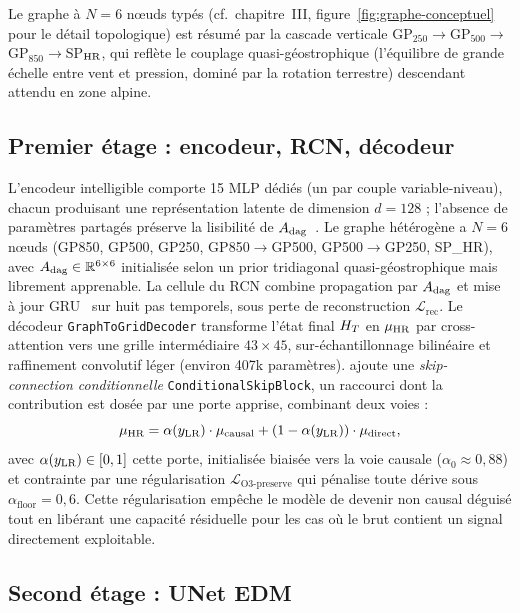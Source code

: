 Le graphe à $N=6$ n\oe uds typés (cf.~chapitre~III, figure~\ref{fig:graphe-conceptuel} pour le détail topologique) est résumé par la cascade verticale GP$_{250}\!\to\!$GP$_{500}\!\to\!$GP$_{850}\!\to\!$SP$_{\text{HR}}$, qui reflète le couplage quasi-géostrophique (l'équilibre de grande échelle entre vent et pression, dominé par la rotation terrestre) descendant attendu en zone alpine.

\subsection{Premier étage : encodeur, RCN, décodeur}
\label{ssec:exp-topo-stage1}

L'encodeur intelligible comporte 15 MLP dédiés (un par couple variable-niveau), chacun produisant une représentation latente de dimension $d = 128$ ; l'absence de paramètres partagés préserve la lisibilité de $A_{\mathrm{dag}}$~\cite{bello_dagma_2022}. Le graphe hétérogène a $N = 6$ nœuds (GP850, GP500, GP250, GP850$\to$GP500, GP500$\to$GP250, SP\_HR), avec $A_{\mathrm{dag}} \in \mathbb{R}^{6 \times 6}$ initialisée selon un prior tridiagonal quasi-géostrophique mais librement apprenable. La cellule du RCN combine propagation par $A_{\mathrm{dag}}$ et mise à jour GRU~\cite{cho_gru_2014} sur huit pas temporels, sous perte de reconstruction $\mathcal{L}_{\mathrm{rec}}$. Le décodeur \texttt{GraphToGridDecoder} transforme l'état final $H_T$ en $\mu_{\text{HR}}$ par cross-attention vers une grille intermédiaire $43 \times 45$, sur-échantillonnage bilinéaire et raffinement convolutif léger (environ 407k paramètres). \Oracle{} ajoute une \emph{skip-connection conditionnelle} \texttt{ConditionalSkipBlock}, un raccourci dont la contribution est dosée par une porte apprise, combinant deux voies :
\begin{equation}
  \mu_{\text{HR}} = \alpha(y_{\text{LR}}) \cdot \mu_{\mathrm{causal}} + (1 - \alpha(y_{\text{LR}})) \cdot \mu_{\mathrm{direct}},
  \label{eq:exp-skip}
\end{equation}
avec $\alpha(y_{\text{LR}}) \in [0, 1]$ cette porte, initialisée biaisée vers la voie causale ($\alpha_0 \approx 0{,}88$) et contrainte par une régularisation $\mathcal{L}_{\mathrm{O3\text{-}preserve}}$ qui pénalise toute dérive sous $\alpha_{\mathrm{floor}} = 0{,}6$. Cette régularisation empêche le modèle de devenir non causal déguisé tout en libérant une capacité résiduelle pour les cas où le \LR{} brut contient un signal directement exploitable.

\subsection{Second étage : UNet EDM}
\label{ssec:exp-topo-stage2}

